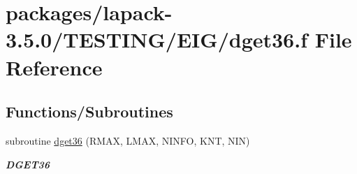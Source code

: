 \hypertarget{dget36_8f}{}\section{packages/lapack-\/3.5.0/\+T\+E\+S\+T\+I\+N\+G/\+E\+I\+G/dget36.f File Reference}
\label{dget36_8f}
\subsection*{Functions/\+Subroutines}
\begin{DoxyCompactItemize}
\item 
subroutine \hyperlink{group__double__eig_gaca33e5cebfce251ead6098f633c8bc13}{dget36} (R\+M\+A\+X, L\+M\+A\+X, N\+I\+N\+F\+O, K\+N\+T, N\+I\+N)
\begin{DoxyCompactList}\small\item\em {\bfseries D\+G\+E\+T36} \end{DoxyCompactList}\end{DoxyCompactItemize}
